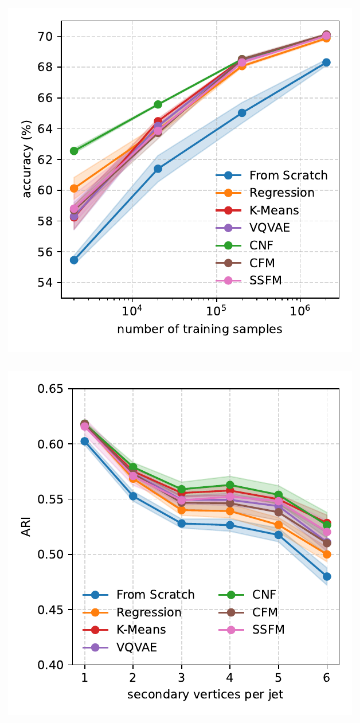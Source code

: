 \begin{figure}[h!]
    \centering
    \begin{subfigure}{0.32\linewidth}
        \centering
        \includegraphics[width=\linewidth]{Figures/foundation_models/mpm2/final/btag_finetune.pdf}
        \caption{}
        \label{fig:btag}
    \end{subfigure}
    \begin{subfigure}[b]{0.32\textwidth}
        \centering
        \includegraphics[width=\linewidth]{Figures/foundation_models/mpm2/final/vtx_finetune_ari.pdf}

\end{subfigure}
\end{figure}
